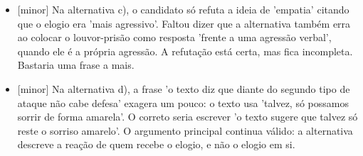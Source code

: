 \documentclass{article}%
\begin{document}
\begin{itemize}%
\item%
{[}minor{]} Na alternativa c), o candidato só refuta a ideia de 'empatia' citando que o elogio era 'mais agressivo'. Faltou dizer que a alternativa também erra ao colocar o louvor{-}prisão como resposta 'frente a uma agressão verbal', quando ele é a própria agressão. A refutação está certa, mas fica incompleta. Bastaria uma frase a mais.%
\item%
{[}minor{]} Na alternativa d), a frase 'o texto diz que diante do segundo tipo de ataque não cabe defesa' exagera um pouco: o texto usa 'talvez, só possamos sorrir de forma amarela'. O correto seria escrever 'o texto sugere que talvez só reste o sorriso amarelo'. O argumento principal continua válido: a alternativa descreve a reação de quem recebe o elogio, e não o elogio em si.%
\end{itemize}%
\end{document}
